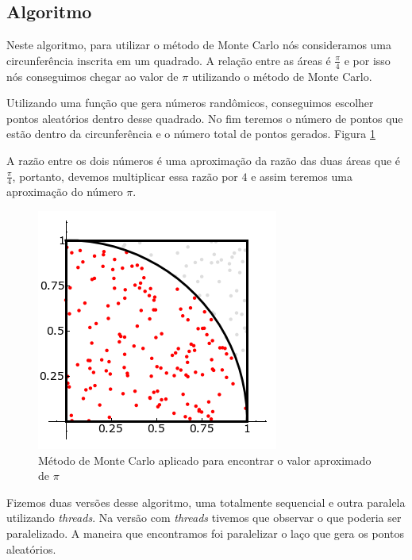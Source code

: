 \documentclass[11pt,twoside]{article}
\begin{document}
    \subsection{Algoritmo}
        
        Neste algoritmo, para utilizar o método de Monte Carlo nós consideramos uma circunferência
        inscrita em um quadrado. A relação entre as áreas é $\frac{\pi}{4}$ e por isso nós
        conseguimos chegar ao valor de $\pi$ utilizando o método de Monte Carlo.
        
        Utilizando uma função que gera números randômicos, conseguimos escolher pontos 
        aleatórios dentro desse quadrado. No fim teremos o número de pontos que estão dentro
        da circunferência e o número total de pontos gerados. Figura \ref{img:montecarlo}
        
        A razão entre os dois números é uma aproximação da razão das duas áreas que é
        $\frac{\pi}{4}$, portanto, devemos multiplicar essa razão por $4$ e assim teremos
        uma aproximação do número $\pi$.

        \begin{figure}[H]
            \centering
        	\includegraphics[scale=0.8]{figures/monte_carlo.png}
    		\caption{Método de Monte Carlo aplicado para encontrar o valor aproximado de $\pi$}
    		\label{img:montecarlo}
    	\end{figure}
	
        Fizemos duas versões desse algoritmo, uma totalmente sequencial e outra paralela
        utilizando \textit{threads}. Na versão com \textit{threads} tivemos que observar
        o que poderia ser paralelizado. A maneira que encontramos foi paralelizar o laço
        que gera os pontos aleatórios.
\end{document}
